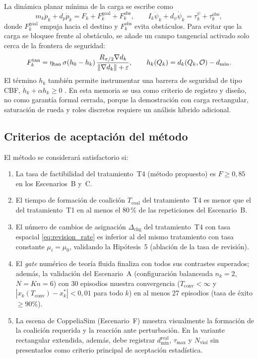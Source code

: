 La dinámica planar mínima de la carga se escribe como
\begin{equation}
  m_k\ddot p_k+d_p\dot p_k=F_k+F_k^{\mathrm{goal}}+F_k^{\mathrm{obs}},
  \qquad
  I_k\ddot\psi_k+d_\psi\dot\psi_k=\tau_k^\psi+\tau_k^{\mathrm{obs}},
  \label{eq:dinamica_carga_rectangular}
\end{equation}
donde $F_k^{\mathrm{goal}}$ empuja hacia el destino y $F_k^{\mathrm{obs}}$ evita
obstáculos. Para evitar que la carga se bloquee frente al obstáculo, se añade un campo
tangencial activado solo cerca de la frontera de seguridad:
\begin{equation}
  F_k^{\mathrm{tan}}=
  \eta_{\mathrm{tan}}\,\sigma(h_0-h_k)\,
  \frac{R_{\pi/2}\nabla d_k}{\left\|\nabla d_k\right\|+\varepsilon},
  \qquad
  h_k(Q_k)=d_k(Q_k,\mathcal{O})-d_{\min}.
  \label{eq:campo_tangencial_obstaculo}
\end{equation}
El término $h_k$ también permite instrumentar una barrera de seguridad de tipo CBF,
$\dot h_k+\alpha h_k\geq0$ \citep{ames2017cbf}. En esta memoria se usa como criterio de
registro y diseño, no como garantía formal cerrada, porque la demostración con carga
rectangular, saturación de rueda y roles discretos requiere un análisis híbrido
adicional.



\subsection{Criterios de aceptación del método}

El método se considerará satisfactorio si:

\begin{enumerate}
  \item La tasa de factibilidad del tratamiento~T4 (método propuesto) es
    $F \geq 0{,}85$ en los Escenarios~B y~C.
  \item El tiempo de formación de coalición $T_{\text{coal}}$ del tratamiento~T4
    es menor que el del tratamiento~T1 en al menos el 80\,\% de las repeticiones
    del Escenario~B.
  \item El número de cambios de asignación $\Delta_{\text{chg}}$ del
    tratamiento~T4 con tasa espacial \eqref{eq:revision_rate} es inferior al del
    mismo tratamiento con tasa constante $\mu_i = \mu_0$, validando la
    Hipótesis~5 (ablación de la tasa de revisión).
  \item El \emph{gate} numérico de teoría fluida finaliza con todos
    sus contrastes superados; además, la validación del Escenario~A
    (configuración balanceada $n_k=2$, $N=Kn=6$) con 30 episodios muestra convergencia
    ($T_{\mathrm{conv}} < \infty$ y
    $|x_k(T_{\text{conv}}) - x_k^*| < 0{,}01$ para todo $k$) en al menos 27 episodios
    (tasa de éxito ${\geq}90\%$).
  \item La escena de CoppeliaSim (Escenario~F) muestra visualmente la formación
    de la coalición requerida y la reacción ante perturbación. En la variante
    rectangular extendida, además, debe registrar $d_{\min}^{\mathrm{real}}$,
    $\tau_{\max}$ y $N_{\mathrm{viol}}$ sin presentarlos como criterio principal de
    aceptación estadística.
\end{enumerate}


